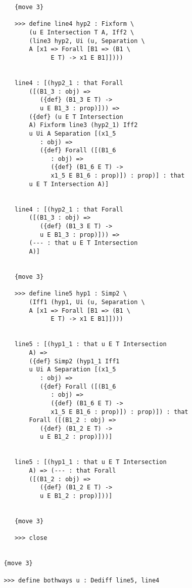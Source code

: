 \documentclass[12pt]{article}
\begin{document}
\begin{verbatim}
            {move 3}

            >>> define line4 hyp2 : Fixform \
                (u E Intersection T A, Iff2 \
                (line3 hyp2, Ui (u, Separation \
                A [x1 => Forall [B1 => (B1 \
                      E T) -> x1 E B1]])))


            line4 : [(hyp2_1 : that Forall 
                ([(B1_3 : obj) => 
                   ({def} (B1_3 E T) -> 
                   u E B1_3 : prop)])) => 
                ({def} (u E T Intersection 
                A) Fixform line3 (hyp2_1) Iff2 
                u Ui A Separation [(x1_5 
                   : obj) => 
                   ({def} Forall ([(B1_6 
                      : obj) => 
                      ({def} (B1_6 E T) -> 
                      x1_5 E B1_6 : prop)]) : prop)] : that 
                u E T Intersection A)]


            line4 : [(hyp2_1 : that Forall 
                ([(B1_3 : obj) => 
                   ({def} (B1_3 E T) -> 
                   u E B1_3 : prop)])) => 
                (--- : that u E T Intersection 
                A)]


            {move 3}

            >>> define line5 hyp1 : Simp2 \
                (Iff1 (hyp1, Ui (u, Separation \
                A [x1 => Forall [B1 => (B1 \
                      E T) -> x1 E B1]])))


            line5 : [(hyp1_1 : that u E T Intersection 
                A) => 
                ({def} Simp2 (hyp1_1 Iff1 
                u Ui A Separation [(x1_5 
                   : obj) => 
                   ({def} Forall ([(B1_6 
                      : obj) => 
                      ({def} (B1_6 E T) -> 
                      x1_5 E B1_6 : prop)]) : prop)]) : that 
                Forall ([(B1_2 : obj) => 
                   ({def} (B1_2 E T) -> 
                   u E B1_2 : prop)]))]


            line5 : [(hyp1_1 : that u E T Intersection 
                A) => (--- : that Forall 
                ([(B1_2 : obj) => 
                   ({def} (B1_2 E T) -> 
                   u E B1_2 : prop)]))]


            {move 3}

            >>> close


         {move 3}

         >>> define bothways u : Dediff line5, line4



\end{verbatim}
\end{document}
